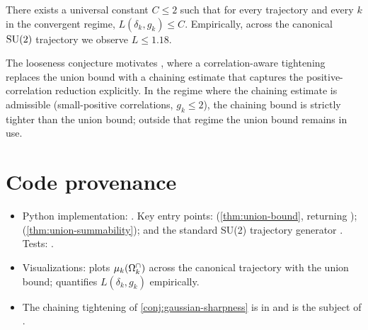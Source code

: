 %

\begin{conjecture}
\label{conj:gaussian-sharpness}
There exists a universal constant $C \le 2$ such that for every
trajectory and every $k$ in the convergent regime,
$L(\delta_k, g_k) \le C$.  Empirically, across the canonical $\mathrm{SU}(2)$
trajectory we observe $L \le 1.18$.
\end{conjecture}

The looseness conjecture motivates ,
where a correlation-aware tightening replaces the union bound with
a chaining estimate that captures the positive-correlation
reduction explicitly.  In the regime where the chaining estimate
is admissible (small-positive correlations, $g_k \le 2$), the
chaining bound is strictly tighter than the union bound; outside
that regime the union bound remains in use.

\section{Code provenance}
\label{sec:overlap-codeanchor}

\begin{itemize}
  \item Python implementation:
    .  Key entry points:
     (\cref{thm:union-bound}, returning
    ); 
    (\cref{thm:union-summability}); and the standard SU(2)
    trajectory generator
    .  Tests:
    .
  \item Visualizations:
    plots $\mu_k(\Omega_k^{\cap})$ across the canonical trajectory with the
    union bound;
    quantifies $L(\delta_k, g_k)$ empirically.
  \item The chaining tightening of \cref{conj:gaussian-sharpness}
    is in  and is the
    subject of .
\end{itemize}

